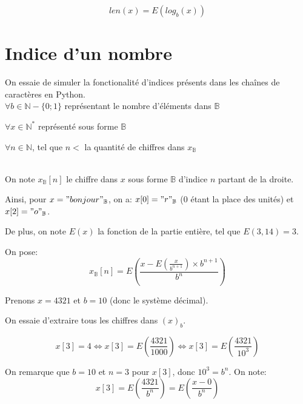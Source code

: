 \documentclass[a4paper, 12pt]{article}
\begin{document}
\begin{equation}
len \left( x \right) = E \left( log_{b} \left( x \right) \right)
\end{equation}

\newpage

\section*{Indice d'un nombre}
On essaie de simuler la fonctionalité d'indices présents dans les chaînes de caractères en Python. \\

$\forall b \in \mathbb{N} - \{0; 1\}$ représentant le nombre d'éléments dans
$\mathbb{B}$

$\forall x \in \mathbb{N}^{*}$ représenté sous forme $\mathbb{B}$

$\forall n \in \mathbb{N}$, tel que $n <$ la quantité de chiffres dans $x_{\mathbb{B}}$

\\

On note $x_{\mathbb{B}}[n]$ le chiffre dans $x$ sous forme $\mathbb{B}$ d'indice $n$ partant de la droite.

Ainsi, pour $x = "bonjour"_{\mathbb{B}}$,
on a: $x[0] = "r"_{\mathbb{B}}$ ($0$ étant la place des unités) et $x[2] = "o"_{\mathbb{B}}$.

De plus, on note $E(x)$ la fonction de la partie entière, tel que $E(3,14) = 3$.

On pose: \\
\begin{equation}
x_{\mathbb{B}}[n] = E \left(\frac{x - E \left(\frac{x}{b^{n + 1}} \right) \times b^{n + 1}}{b^{n}} \right)
\end{equation}


Prenons $x = 4321$ et $b = 10$ (donc le système décimal).


On essaie d'extraire tous les chiffres dans $(x)_{b}$.

\begin{equation}
x[3] = 4 \Leftrightarrow x[3] = E \left( \frac{4321}{1000} \right) \Leftrightarrow
x[3] = E \left( \frac{4321}{10^{3}} \right)
\end{equation}

On remarque que $b = 10$ et $n = 3$ pour $x[3]$, donc $10^{3} = b^{n}$. On note:
\begin{equation}
x[3] = E \left( \frac{4321}{b^n} \right) = E \left( \frac{x - 0}{b^n} \right)
\end{equation}
\end{document}
